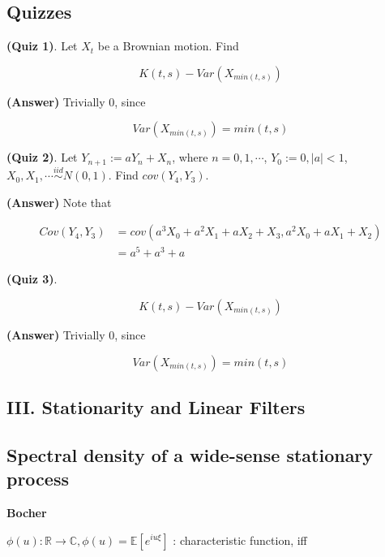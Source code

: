 \documentclass[12pt]{article}
\theoremstyle{nonumberbreak}
\begin{document}
\subsection*{Quizzes}

\textbf{(Quiz 1)}. Let $X_t$ be a Brownian motion. Find

$$
K(t,s) - Var(X_{min(t,s)})
$$


\textbf{(Answer)} Trivially $0$, since

$$
Var(X_{min(t,s)}) = min(t,s)
$$



\textbf{(Quiz 2)}. Let $Y_{n+1} := a Y_n + X_n$, where $n=0,1,\cdots$, $Y_0 := 0, |a| < 1$, $X_0, X_1, \cdots \overset{iid}{\sim} N(0,1)$. Find $cov(Y_4, Y_3)$. 


\textbf{(Answer)} Note that 

$$
\begin{aligned}
Cov(Y_4, Y_3) &= cov(a^3 X_0 + a^2 X_1 + a X_2 + X_3, a^2 X_0 + a X_1 + X_2) \\[8pt]
&= a^5 + a^3 + a
\end{aligned}
$$




\textbf{(Quiz 3)}. 


$$
K(t,s) - Var(X_{min(t,s)})
$$


\textbf{(Answer)} Trivially $0$, since

$$
Var(X_{min(t,s)}) = min(t,s)
$$




\pagebreak
\begin{center}
\section*{III. Stationarity and Linear Filters}
\end{center}
\setcounter{section}{3}
\setcounter{subsection}{0}


\subsection{Spectral density of a wide-sense stationary process}


\textbf{Bocher}

$\phi(u): \mathbb{R} \to \mathbb{C}, \phi(u) = \mathbb{E} [e^{iu\xi}]$ : characteristic function, iff
\end{document}
